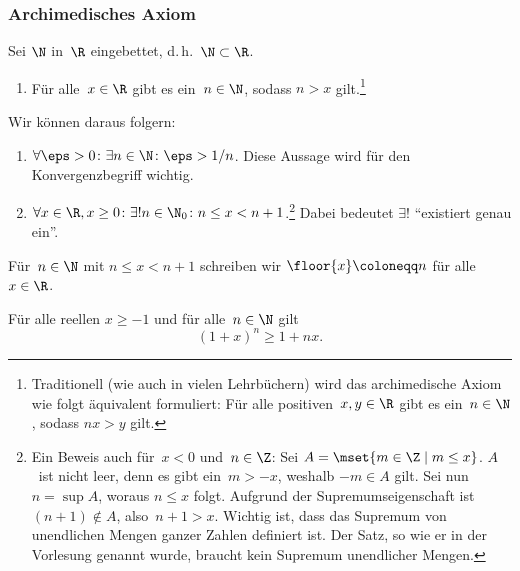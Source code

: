\documentclass[a4paper]{article}
\begin{document}
\subsubsection{Archimedisches Axiom}

\begin{axiom}
    Sei $\N$ in~$\R$ eingebettet, d.\,h.\ $\N \subset \R$.
    \begin{enumerate}[resume*=axioms]
        \item Für alle~$x \in \R$ gibt es ein~$n \in \N$, sodass $n > x$ gilt.\footnote{Traditionell (wie auch in vielen Lehrbüchern) wird das archimedische Axiom wie folgt äquivalent formuliert: Für alle positiven~$x, y \in \R$ gibt es ein~$n \in \N$, sodass $nx > y$ gilt.}
    \end{enumerate}
\end{axiom}

Wir können daraus folgern:
\begin{enumerate}[resume*=conclusions]
    \item $\forall \eps > 0\colon \exists n \in \N\colon \eps > 1/n$. Diese Aussage wird für den Konvergenzbegriff wichtig.\label{arch:inverse}
    \item $\forall x \in \R, x \geq 0\colon \exists! n \in \N_0\colon n \leq x < n+1$.\footnote{Ein Beweis auch für~$x < 0$ und~$n \in \Z$: Sei $A = \mset{m \in \Z \mid m \leq x}$. $A$~ist nicht leer, denn es gibt ein~$m > -x$, weshalb $-m \in A$ gilt. Sei nun~$n = \sup A$, woraus $n \leq x$ folgt. Aufgrund der Supremumseigenschaft ist $(n+1) \notin A$, also~$n+1 > x$. Wichtig ist, dass das Supremum von unendlichen Mengen ganzer Zahlen definiert ist. Der Satz, so wie er in der Vorlesung genannt wurde, braucht kein Supremum unendlicher Mengen.} Dabei bedeutet $\exists!$ "`existiert genau ein"'.
\end{enumerate}

\begin{definition}
    Für~$n \in \N$ mit $n \leq x < n+1$ schreiben wir $\floor{x} \coloneqq n$ für alle~$x \in \R$.
\end{definition}

\begin{theorem}\label{thm:bernoulliineq}
    Für alle reellen $x \geq -1$ und für alle~$n \in \N$ gilt
    \begin{equation*}
        (1 + x)^n \geq 1 + nx.
    \end{equation*}
\end{theorem}
\end{document}
